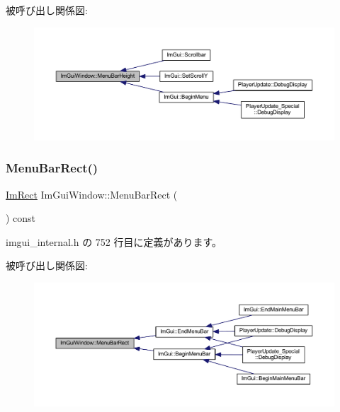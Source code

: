 被呼び出し関係図\+:\nopagebreak
\begin{figure}[H]
\begin{center}
\leavevmode
\includegraphics[width=350pt]{struct_im_gui_window_acfb8bdad2e3ea6102589813ae32d0364_icgraph}
\end{center}
\end{figure}
\mbox{\label{struct_im_gui_window_a59df76c1445aaaf0b43456c83c1a88e5}} 
\subsubsection{\texorpdfstring{Menu\+Bar\+Rect()}{MenuBarRect()}}
{\footnotesize\ttfamily \mbox{\hyperlink{struct_im_rect}{Im\+Rect}} Im\+Gui\+Window\+::\+Menu\+Bar\+Rect (\begin{DoxyParamCaption}{ }\end{DoxyParamCaption}) const\hspace{0.3cm}{\ttfamily [inline]}}



 imgui\+\_\+internal.\+h の 752 行目に定義があります。

被呼び出し関係図\+:\nopagebreak
\begin{figure}[H]
\begin{center}
\leavevmode
\includegraphics[width=350pt]{struct_im_gui_window_a59df76c1445aaaf0b43456c83c1a88e5_icgraph}
\end{center}
\end{figure}
\mbox{\label{struct_im_gui_window_a147da28bf5d167cbe0a363c4a578dea1}} 
